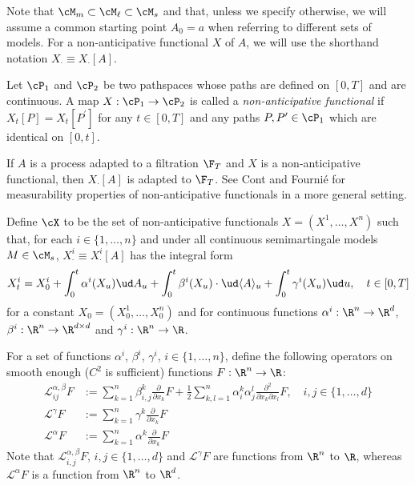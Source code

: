 \documentclass[11pt]{article}
\begin{document}
Note that $\cM_m \subset \cM_\ell \subset \cM_s$ and that, unless we specify otherwise, we will assume a common starting point $A_0 = a$ when referring to different sets of models. For a non-anticipative functional $X$ of $A$, we will use the shorthand notation $X_\cdot \equiv X_\cdot[A]$.

\begin{definition}
\label{definition: non-anticipative functional}
Let $\cP_1$ and $\cP_2$ be two pathspaces whose paths are defined on $[0,T]$ and are continuous. A map $X: \cP_1 \to \cP_2$ is called a \textit{non-anticipative functional} if $X_t[P] = X_t[P^\prime]$ for any $t \in [0,T]$ and any paths $P, P^\prime \in \cP_1$ which are identical on $[0,t]$.
\end{definition}

If $A$ is a process adapted to a filtration $\F_T$ and $X$ is a non-anticipative functional, then $X_\cdot[A]$ is adapted to $\F_T$. See Cont and Fourni\'e \cite{Cont-Fournie:pathwise, Cont-Fournie:stochastic} for measurability properties of non-anticipative functionals in a more general setting.

\begin{definition}
\label{definition: functionals in cX}
Define $\cX$ to be the set of non-anticipative functionals $X = (X^1,\ldots,X^n)$ such that, for each $i \in \{1,\ldots,n\}$ and under all continuous semimartingale models $M \in \cM_s$, $X^i_\cdot \equiv X^i_\cdot[A]$ has the integral form
\begin{equation}
\label{integral form of X^i}
X^i_t = X^i_0 + \int_0^t \alpha^i(X_u) \ud A_u + \int_0^t \beta^i(X_u) \cdot \ud \langle A \rangle_u + \int_0^t \gamma^i(X_u) \ud u, \quad t \in [0,T]
\end{equation}
for a constant $X_0 = (X^1_0,\ldots,X^n_0)$ and for continuous functions $\alpha^i: \R^n \to \R^d$, $\beta^i: \R^n \to \R^{d \times d}$ and $\gamma^i: \R^n \to \R$.
\end{definition}

For a set of functions $\alpha^i$, $\beta^i$, $\gamma^i$, $i \in \{1,\ldots,n\}$, define the following operators on smooth enough ($C^2$ is sufficient) functions $F: \R^n \to \R$:
\begin{align}
\mathcal{L}^{\alpha, \beta}_{ij} F &:= \sum_{k=1}^n \beta^k_{i,j} \frac{\partial}{\partial x_k} F + \frac{1}{2} \sum_{k,l=1}^n \alpha^k_i \alpha^l_j \frac{\partial^2}{\partial x_k \partial x_l} F , \quad i,j \in \{1,\ldots,d\}
\label{second variation operator} \\
\mathcal{L}^{\gamma} F &:= \sum_{k=1}^n \gamma^k \frac{\partial}{\partial x_k} F
\label{time variation operator} \\
\mathcal{L}^{\alpha} F &:= \sum_{k=1}^n \alpha^k \frac{\partial}{\partial x_k} F
\label{hedge ratio operator}
\end{align}
Note that $\mathcal{L}^{\alpha, \beta}_{i,j} F$, $i,j \in \{1,\ldots,d\}$ and $\mathcal{L}^{\gamma} F$ are functions from $\R^n$ to $\R$, whereas $\mathcal{L}^{\alpha} F$ is a function from $\R^n$ to $\R^d$.
\end{document}
